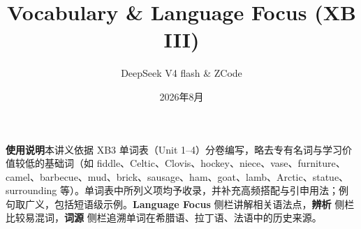 \documentclass[12pt, a4paper]{ctexart}
\title{Vocabulary \& Language Focus (XB III)}
\author{DeepSeek V4 flash \& ZCode}
\date{2026年8月}
\begin{document}
\maketitle
\begin{cbox}
\textbf{使用说明}\quad 本讲义依据 XB3 单词表（Unit 1--4）分卷编写，略去专有名词与学习价值较低的基础词（如 fiddle、Celtic、Clovis、hockey、niece、vase、furniture、camel、barbecue、mud、brick、sausage、ham、goat、lamb、Arctic、statue、surrounding 等）。单词表中所列义项均予收录，并补充高频搭配与引申用法；例句取广义，包括短语级示例。\textcolor{orange!80!black}{\textbf{Language Focus}} 侧栏讲解相关语法点，\textcolor{TealBlue}{\textbf{辨析}} 侧栏比较易混词，\textcolor{OliveGreen}{\textbf{词源}} 侧栏追溯单词在希腊语、拉丁语、法语中的历史来源。
\end{cbox}
\newpage

\tableofcontents
\newpage








\end{document}
